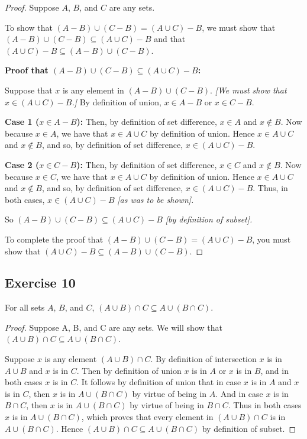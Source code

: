\documentclass[14pt]{extarticle}
\begin{document}
\begin{proof}
  Suppose $A$, $B$, and $C$ are any sets.

  To show that \((A - B) \cup (C - B) = (A \cup C ) - B\), we must show that \((A - B) \cup (C - B) \subseteq (A \cup C) - B\)
  and that \((A \cup C) - B \subseteq (A - B) \cup (C - B)\).

    {\bf Proof that \((A - B) \cup (C - B) \subseteq (A \cup C) - B\):}

  Suppose that $x$ is any element in \((A - B) \cup (C - B)\). {\it [We must show that \(x \in (A \cup C ) - B\).]}
  By definition of union, \(x \in A - B\) or \(x \in C - B\).

    {\bf Case 1 (\(x \in A - B\)):} Then, by definition of set difference, \(x \in A\) and \(x \notin B\). Now because
  \(x \in A\), we have that \(x \in A \cup C\) by definition of union. Hence \(x \in A \cup C\) and \(x \notin B\), and
  so, by definition of set difference, \(x \in (A \cup C ) - B\).

    {\bf Case 2 (\(x \in C - B\)):} Then, by definition of set difference, \(x \in C\) and \(x \notin B\). Now because
  \(x \in C\), we have that \(x \in A \cup C\) by definition of union. Hence \(x \in A \cup C\) and \(x \notin B\), and
  so, by definition of set difference, \(x \in (A \cup C) - B\). Thus, in both cases, \(x \in (A \cup C ) - B\)
  {\it [as was to be shown].}

  So \((A - B) \cup (C - B) \subseteq (A \cup C ) - B\) {\it [by definition of subset].}

  To complete the proof that \((A - B ) \cup (C - B) = (A \cup C) - B\), you must show that
  \((A \cup C) - B \subseteq (A - B) \cup (C - B)\).
\end{proof}

\subsection{Exercise 10}
For all sets $A$, $B$, and $C$, \((A \cup B) \cap C \subseteq A \cup (B \cap C)\).

\begin{proof}
  Suppose A, B, and C are any sets. We will show that \((A \cup B) \cap C \subseteq A \cup (B \cap C)\).

  Suppose $x$ is any element \((A \cup B) \cap C\). By definition of intersection $x$ is in \(A \cup B\) and $x$
  is in $C$. Then by definition of union $x$ is in $A$ or $x$ is in $B$, and in both cases $x$ is in $C$. It follows by
  definition of union that in case $x$ is in $A$ and $x$ is in $C$, then $x$ is in \(A \cup (B \cap C)\) by virtue of
  being in $A$. And in case $x$ is in \(B \cap C\), then $x$ is in \(A \cup (B \cap C)\) by virtue of being in
  \(B \cap C\). Thus in both cases $x$ is in \(A \cup (B \cap C )\), which proves that every element in \((A \cup B) \cap C\)
  is in \(A \cup (B \cap C)\). Hence \((A \cup B) \cap C \subseteq A \cup (B \cap C)\) by definition of subset.
\end{proof}
\end{document}
